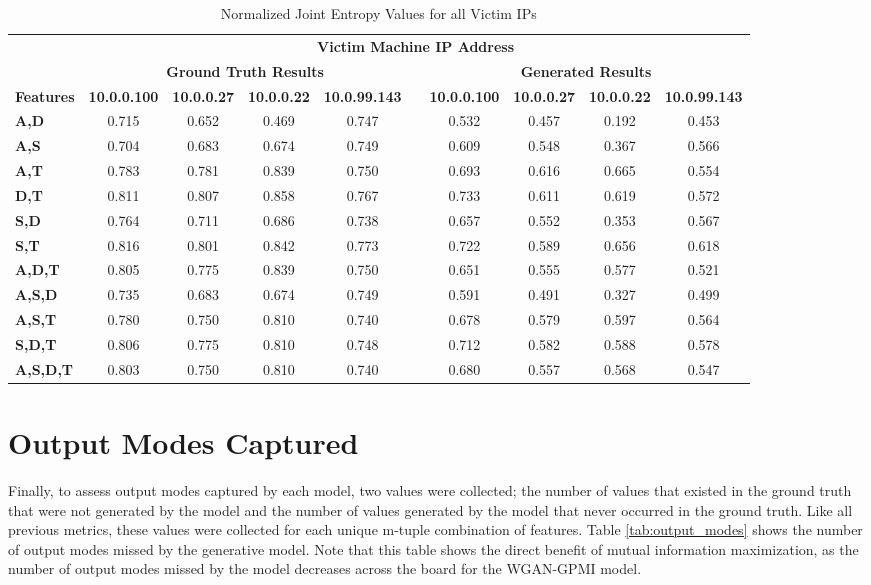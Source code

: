 \begin{table}[!htbp]
	\caption{Normalized Joint Entropy Values for all Victim IPs}
	\label{tab:je2}
	\centering
	\begin{adjustbox}{angle=90}
		\begin{tabular}{l|c|c|c|c|c|c|c|c|c|}
			\multicolumn{1}{c|}{} & \multicolumn{9}{c|}{\textbf{Victim Machine IP Address}} \\
			\multicolumn{1}{c|}{} & \multicolumn{4}{c|}{\textbf{Ground Truth Results}} &  & \multicolumn{4}{c|}{\textbf{Generated Results}} \\
			\multicolumn{1}{c|}{\textbf{Features}} & \textbf{10.0.0.100} & \textbf{10.0.0.27} & \textbf{10.0.0.22} & \textbf{10.0.99.143} &  & \textbf{10.0.0.100} & \textbf{10.0.0.27} & \textbf{10.0.0.22} & \textbf{10.0.99.143} \\ \hline
			\textbf{A,D} & 0.715 & 0.652 & 0.469 & 0.747 &  & 0.532 & 0.457 & 0.192 & 0.453 \\
			\textbf{A,S} & 0.704 & 0.683 & 0.674 & 0.749 &  & 0.609 & 0.548 & 0.367 & 0.566 \\
			\textbf{A,T} & 0.783 & 0.781 & 0.839 & 0.750 &  & 0.693 & 0.616 & 0.665 & 0.554 \\
			\textbf{D,T} & 0.811 & 0.807 & 0.858 & 0.767 &  & 0.733 & 0.611 & 0.619 & 0.572 \\
			\textbf{S,D} & 0.764 & 0.711 & 0.686 & 0.738 &  & 0.657 & 0.552 & 0.353 & 0.567 \\
			\textbf{S,T} & 0.816 & 0.801 & 0.842 & 0.773 &  & 0.722 & 0.589 & 0.656 & 0.618 \\ \hline
			\textbf{A,D,T} & 0.805 & 0.775 & 0.839 & 0.750 &  & 0.651 & 0.555 & 0.577 & 0.521 \\
			\textbf{A,S,D} & 0.735 & 0.683 & 0.674 & 0.749 &  & 0.591 & 0.491 & 0.327 & 0.499 \\
			\textbf{A,S,T} & 0.780 & 0.750 & 0.810 & 0.740 &  & 0.678 & 0.579 & 0.597 & 0.564 \\
			\textbf{S,D,T} & 0.806 & 0.775 & 0.810 & 0.748 &  & 0.712 & 0.582 & 0.588 & 0.578 \\ \hline
			\textbf{A,S,D,T} & 0.803 & 0.750 & 0.810 & 0.740 &  & 0.680 & 0.557 & 0.568 & 0.547
		\end{tabular}
	\end{adjustbox}
\end{table}

\section{Output Modes Captured}
\label{sec:output}
Finally, to assess output modes captured by each model, two values were collected; the number of values that existed in the ground truth that were not generated by the model and the number of values generated by the model that never occurred in the ground truth. Like all previous metrics, these values were collected for each unique m-tuple combination of features. Table \ref{tab:output_modes} shows the number of output modes missed by the generative model. Note that this table shows the direct benefit of mutual information maximization, as the number of output modes missed by the model decreases across the board for the WGAN-GPMI model.

